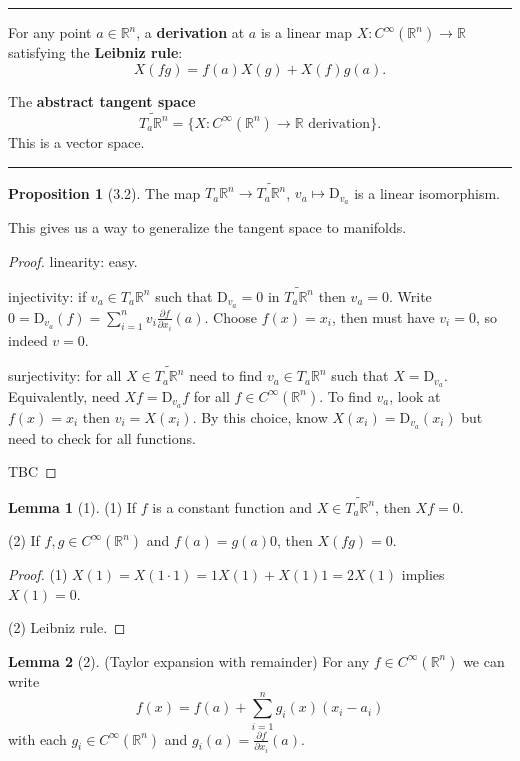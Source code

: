 \documentclass[12pt]{article}
\newcommand{\keyword}[1]{\textbf{#1}}
\newcommand{\sepline}{\rule{\textwidth}{0.4pt}}
\theoremstyle{definition}
\newtheorem{lemma}{Lemma}
\newtheorem{proposition}{Proposition}
\newcommand{\R}{\mathbb{R}}
\newcommand{\<}{\left\langle}
\renewcommand{\>}{\right\rangle}
\newcommand{\DD}{\mathrm{D}}
\newcommand{\pdv}[2]{\frac{\partial #1}{\partial #2}}
\renewcommand{\tilde}{\widetilde}
\begin{document}
\sepline

For any point $a \in \R^n$, a \keyword{derivation} at $a$ is a linear map $X : C^{\infty}(\R^n) \to \R$ satisfying the \keyword{Leibniz rule}:
\[
    X(fg) = f(a)X(g) + X(f)g(a).
\]

The \keyword{abstract tangent space}
\[
    \tilde{T_a\R^n} = \{X : C^\infty(\R^n) \to \R \text{ derivation}\}.
\]
This is a vector space.

\sepline

\begin{proposition}[3.2]
    The map $T_a\R^n \to \tilde{T_a\R^n}$, $v_a \mapsto \DD_{v_a}$ is a linear isomorphism.
\end{proposition}

This gives us a way to generalize the tangent space to manifolds.

\begin{proof}
    linearity: easy.
    
    injectivity: if $v_a \in T_a\R^n$ such that $\DD_{v_a} = 0$ in $\tilde{T_a\R^n}$ then $v_a = 0$.
    Write $0 = \DD_{v_a}(f) = \sum_{i=1}^{n} v_i\pdv{f}{x_i}(a)$.
    Choose $f(x) = x_i$, then must have $v_i = 0$, so indeed $v = 0$.
    
    surjectivity: for all $X \in \tilde{T_a\R^n}$ need to find $v_a \in T_a\R^n$ such that $X = \DD_{v_a}$.
    Equivalently, need $Xf = \DD_{v_a}f$ for all $f \in C^\infty(\R^n)$.
    To find $v_a$, look at $f(x) = x_i$ then $v_i = X(x_i)$.
    By this choice, know $X(x_i) = \DD_{v_a}(x_i)$ but need to check for all functions.

    TBC
\end{proof}


\begin{lemma}[1]
    (1) If $f$ is a constant function and $X \in \tilde{T_a\R^n}$, then $Xf = 0$.

    (2) If $f, g \in C^\infty(\R^n)$ and $f(a) = g(a) 0$, then $X(fg) = 0$.
\end{lemma}

\begin{proof}
    (1) $X(1) = X(1 \cdot 1) = 1X(1) + X(1) 1 = 2X(1)$ implies $X(1) = 0$.

    (2) Leibniz rule.
\end{proof}

\begin{lemma}[2]
    (Taylor expansion with remainder) For any $f \in C^\infty(\R^n)$ we can write
    \[
        f(x) = f(a) + \sum_{i=1}^{n} g_i(x) (x_i - a_i)
    \]
    with each $g_i \in C^\infty(\R^n)$ and $g_i(a) = \pdv{f}{x_i}(a)$.

\end{lemma}
\end{document}

